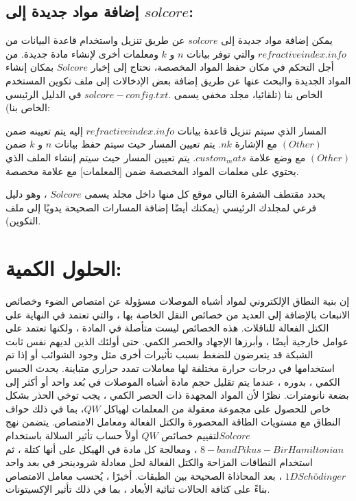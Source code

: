 \subsection{إضافة مواد جديدة إلى $ solcore $:}
يمكن إضافة مواد جديدة إلى $ solcore $ عن طريق تنزيل  واستخدام قاعدة البيانات من $ refractiveindex.info $ والتي توفر بيانات $ n $ و $ k $ ومعلمات أخرى لإنشاء مادة جديدة.
من أجل التحكم في مكان حفظ المواد المخصصة، نحتاج إلى إخبار $ Solcore $ بمكان إنشاء المواد الجديدة والبحث عنها عن طريق إضافة بعض الإدخالات إلى ملف تكوين المستخدم الخاص بنا (تلقائيا، مجلد مخفي يسمى .$ solcore-config.txt $ في الدليل الرئيسي الخاص بنا):

المسار الذي سيتم تنزيل قاعدة بيانات $ refractiveindex.info $ إليه يتم تعيينه ضمن $ (Other) $ مع الإشارة $ nk $.
يتم تعيين المسار حيث سيتم حفظ بيانات $ n $ و $ k $ ضمن $ (Other) $ مع وضع علامة $ custom_mats $.
يتم تعيين المسار حيث سيتم إنشاء الملف الذي يحتوي على معلمات المواد المخصصة ضمن [المعلمات] مع علامة مخصصة.

يحدد مقتطف الشفرة التالي موقع كل منها داخل مجلد يسمى $ Solcore $ ، وهو دليل فرعي لمجلدك الرئيسي (يمكنك أيضًا إضافة المسارات الصحيحة يدويًا إلى ملف التكوين).


\section{الحلول الكمية:}
إن بنية النطاق الإلكتروني لمواد أشباه الموصلات مسؤولة عن امتصاص الضوء وخصائص الانبعاث بالإضافة إلى العديد من خصائص النقل الخاصة بها ، والتي تعتمد في النهاية على الكتل الفعالة للناقلات. هذه الخصائص ليست متأصلة في المادة ، ولكنها تعتمد على عوامل خارجية أيضًا ، وأبرزها الإجهاد والحصر الكمي. حتى أولئك الذين لديهم نفس ثابت الشبكة قد يتعرضون للضغط بسبب تأثيرات أخرى مثل وجود الشوائب أو إذا تم استخدامها في درجات حرارة مختلفة لها معاملات تمدد حراري متباينة. يحدث الحبس الكمي ، بدوره ، عندما يتم تقليل حجم مادة أشباه الموصلات في بُعد واحد أو أكثر إلى بضعة نانومترات. نظرًا لأن المواد المجهدة ذات الحصر الكمي ، يجب توخي الحذر بشكل خاص للحصول على مجموعة معقولة من المعلمات لهياكل $ QW  $، بما في ذلك حواف النطاق مع مستويات الطاقة المحصورة والكتل الفعالة ومعامل الامتصاص.
يتضمن نهج $ Solcore  $لتقييم خصائص $ QW $ أولاً حساب تأثير السلالة باستخدام $ 8-band Pikus-Bir Hamiltonian $ ، ومعالجة كل مادة في الهيكل على أنها كتلة ، ثم استخدام النطاقات المزاحة والكتل الفعالة لحل معادلة شرودينجر في بعد واحد  $ 1D Schödinger $ ، بعد المحاذاة الصحيحة بين الطبقات. أخيرًا ، يُحسب معامل الامتصاص بناءً على كثافة الحالات ثنائية الأبعاد ، بما في ذلك تأثير الإكسيتونات.

